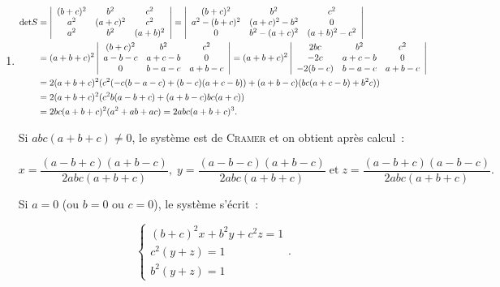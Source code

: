 {{\begin{enumerate}
Le système est compatible si et seulement si $(m-a)(m-c)=0$ ou encore ($m=a$ ou $m=c$). Dans ce cas, l'ensemble des solutions est~:~$\{(x,\frac{m-c}{a-c}-x;\frac{m-a}{c-a}),\;x\in\Rr\}$.

Si $a=b=c$, le système s'écrit~:~$x+y+z=1=\frac{m}{a}=\frac{a}{m}$. Le système est compatible si et seulement si $m=a=b=c$ et dans ce cas l'ensemble des solutions est~:~$\{(x,y,1-x-y),\;(x,y)\in\Rr^2\}$.

\item  

\begin{align*}\ensuremath
\mbox{det}S&=\left|
\begin{array}{ccc}
(b+c)^2&b^2&c^2\\
a^2&(a+c)^2&c^2\\
a^2&b^2&(a+b)^2
\end{array}
\right|=\left|
\begin{array}{ccc}
(b+c)^2&b^2&c^2\\
a^2-(b+c)^2&(a+c)^2-b^2&0\\
0&b^2-(a+c)^2&(a+b)^2-c^2
\end{array}
\right|\\
 &=(a+b+c)^2\left|
\begin{array}{ccc}
(b+c)^2&b^2&c^2\\
a-b-c&a+c-b&0\\
0&b-a-c&a+b-c
\end{array}
\right|=(a+b+c)^2\left|
\begin{array}{ccc}
2bc&b^2&c^2\\
-2c&a+c-b&0\\
-2(b-c)&b-a-c&a+b-c
\end{array}
\right|
\\
 &=2(a+b+c)^2(c^2(-c(b-a-c)+(b-c)(a+c-b))+(a+b-c)(bc(a+c-b)+b^2c))\\
 &=2(a+b+c)^2(c^2b(a-b+c)+(a+b-c)bc(a+c))\\
 &=2bc(a+b+c)^2(a^2+ab+ac)=2abc(a+b+c)^3.
\end{align*}

Si $abc(a+b+c)\neq0$, le système est de \textsc{Cramer} et on obtient après calcul~:

$$x=\frac{(a-b+c)(a+b-c)}{2abc(a+b+c)},\;y=\frac{(a-b-c)(a+b-c)}{2abc(a+b+c)}\;\mbox{et}\;z=\frac{(a-b+c)(a-b-c)}{2abc(a+b+c)}.$$ 

Si $a=0$ (ou $b=0$ ou $c=0$), le système s'écrit~:

$$\left\{
\begin{array}{l}
(b+c)^2x+b^2y+c^2z=1\\
c^2(y+z)=1\\
b^2(y+z)=1
\end{array}
\right.
.$$


\end{enumerate}}}
